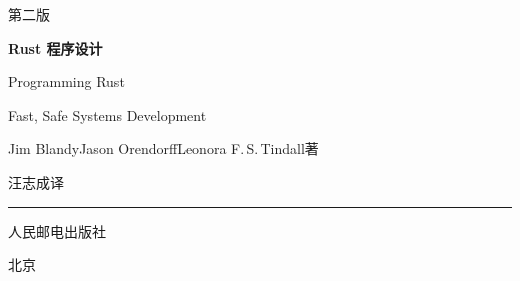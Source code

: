 \thispagestyle{empty}
\begingroup
\centering
\vspace*{2.6cm}

{\sffamily\fontsize{11bp}{14bp}\selectfont 第二版\par}
\vspace{14bp}

{\sffamily\fontsize{34bp}{40bp}\selectfont\bfseries Rust 程序设计\par}
\vspace{16bp}

{\fontsize{13.5bp}{19bp}\selectfont Programming Rust\par}
\vspace{4bp}
{\fontsize{11.5bp}{16bp}\selectfont Fast, Safe Systems Development\par}

\vspace{54bp}
{\sffamily\fontsize{12bp}{17bp}\selectfont Jim Blandy\quad Jason Orendorff\quad Leonora F.\,S.\,Tindall\quad 著\par}
\vspace{10bp}
{\sffamily\fontsize{12bp}{17bp}\selectfont 汪志成\quad 译\par}

\vfill
{\color{ink}\rule{0.55\textwidth}{0.5bp}\par}
\vspace{12bp}
{\sffamily\fontsize{12bp}{16bp}\selectfont 人民邮电出版社\par}
\vspace{4bp}
{\sffamily\fontsize{9bp}{12bp}\selectfont 北京\par}
\vspace{1.2cm}
\endgroup
\clearpage
